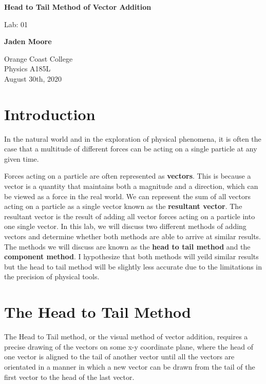 \documentclass[12pt]{article}
\begin{document}
\begin{titlepage}
    \begin{center}
        \vspace*{1cm}
        \textbf{Head to Tail Method of Vector Addition}

        \vspace{0.5cm}
        Lab: 01

        \vspace{1cm}

        \textbf{Jaden Moore}

        \vfill

        Orange Coast College\\
        Physics A185L\\
        August 30th, 2020

    \end{center}
\end{titlepage}

\pagestyle{fancy}
\fancyhf{}
\setlength{\headheight}{15pt}
\cfoot{\thepage}

\section{Introduction}

In the natural world and in the exploration of physical phenomena, it is often the case that a multitude of different forces can be acting on a single particle at any given time.

Forces acting on a particle are often represented as \textbf{vectors}. This is because a vector is a quantity that maintains both a magnitude and a direction, which can be viewed as a force in the real world. We can represent the sum of all vectors acting on a particle as a single vector known as the \textbf{resultant vector}. The resultant vector is the result of adding all vector forces acting on a particle into one single vector. In this lab, we will discuss two different methods of adding vectors and determine whether both methods are able to arrive at similar results. The methods we will discuss are known as the \textbf{head to tail method} and the \textbf{component method}. I hypothesize that both methods will yeild similar results but the head to tail method will be slightly less accurate due to the limitations in the precision of physical tools.

\section{The Head to Tail Method}
The Head to Tail method, or the visual method of vector addition, requires a precise drawing of the vectors on some x-y coordinate plane, where the head of one vector is aligned to the tail of another vector until all the vectors are orientated in a manner in which a new vector can be drawn from the tail of the first vector to the head of the last vector.
\end{document}
